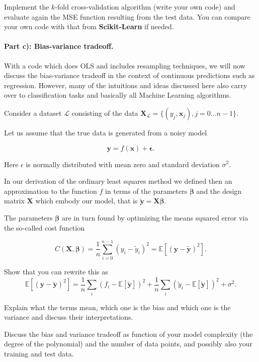 \documentclass[%
oneside,                 %
final,                   %
10pt]{article}
\begin{document}
Implement the $k$-fold cross-validation algorithm (write your own
code) and evaluate again the MSE function resulting
from the test data. You can compare your own code with that from
\textbf{Scikit-Learn} if needed.




\paragraph{Part c): Bias-variance tradeoff.}
With a code which does OLS and includes resampling techniques, 
we will now discuss the bias-variance tradeoff in the context of
continuous predictions such as regression. However, many of the
intuitions and ideas discussed here also carry over to classification
tasks and basically all Machine Learning algorithms. 

Consider a
dataset $\mathcal{L}$ consisting of the data
$\mathbf{X}_\mathcal{L}=\{(y_j, \boldsymbol{x}_j), j=0\ldots n-1\}$.

Let us assume that the true data is generated from a noisy model

\[
\bm{y}=f(\boldsymbol{x}) + \bm{\epsilon}.
\]

Here $\epsilon$ is normally distributed with mean zero and standard
deviation $\sigma^2$.

In our derivation of the ordinary least squares method we defined then
an approximation to the function $f$ in terms of the parameters
$\bm{\beta}$ and the design matrix $\bm{X}$ which embody our model,
that is $\bm{\tilde{y}}=\bm{X}\bm{\beta}$.

The parameters $\bm{\beta}$ are in turn found by optimizing the means
squared error via the so-called cost function

\[
C(\bm{X},\bm{\beta}) =\frac{1}{n}\sum_{i=0}^{n-1}(y_i-\tilde{y}_i)^2=\mathbb{E}\left[(\bm{y}-\bm{\tilde{y}})^2\right].
\]

Show that you can rewrite  this as
\[
\mathbb{E}\left[(\bm{y}-\bm{\tilde{y}})^2\right]=\frac{1}{n}\sum_i(f_i-\mathbb{E}\left[\bm{\tilde{y}}\right])^2+\frac{1}{n}\sum_i(\tilde{y}_i-\mathbb{E}\left[\bm{\tilde{y}}\right])^2+\sigma^2.
\]

Explain what the terms mean, which one is the bias and which one is
the variance and discuss their interpretations.


Discuss the bias and variance tradeoff as function
of your model complexity (the degree of the polynomial) and the number
of data points, and possibly also your training and test data.
\end{document}
